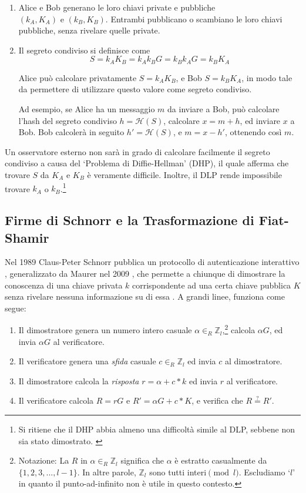 \begin{enumerate}
	\item Alice e Bob generano le loro chiavi private e pubbliche \((k_A, K_A) \textrm{ e } (k_B, K_B)\). Entrambi pubblicano o scambiano le loro chiavi pubbliche, senza rivelare quelle private.

	\item Il segreto condiviso si definisce come \[S = k_A K_B = k_A k_B G = k_B k_A G = k_B K_A\]

	Alice può calcolare privatamente \(S = k_A K_B\), e Bob \(S = k_B K_A\), in modo tale da permettere di utilizzare questo valore come segreto condiviso.

	Ad esempio, se Alice ha un messaggio $m$ da inviare a Bob, può calcolare l'hash del segreto condiviso \(h = \mathcal{H}(S)\), calcolare $x = m + h$, ed inviare $x$ a Bob. Bob calcolerà in seguito $h' = \mathcal{H}(S)$, e $m = x - h'$, ottenendo così $m$.
\end{enumerate}   

Un osservatore esterno non sarà in grado di calcolare facilmente il segreto condiviso a causa del `Problema di Diffie-Hellman' (DHP), il quale afferma che trovare $S$ da $K_A$ e $K_B$ è veramente difficile. Inoltre, il DLP rende impossibile trovare $k_A$ o $k_B$.\footnote{Si ritiene che il DHP abbia almeno una difficoltà simile al DLP, sebbene non sia stato dimostrato. \cite{diffie-hellman-problem}}


\subsection{Firme di Schnorr e la Trasformazione di Fiat-Shamir}
\label{sec:schnorr-fiat-shamir}

Nel 1989 Claus-Peter Schnorr pubblica un protocollo di autenticazione interattivo \cite{schnorr-signatures}, generalizzato da Maurer nel 2009 \cite{simple-zk-proof-maurer}, che permette a chiunque di dimostrare la conoscenza di una chiave privata $k$ corrispondente ad una certa chiave pubblica $K$ senza rivelare nessuna informazione su di essa \cite{Signatures2015BorromeanRS}. A grandi linee, funziona come segue:

\begin{enumerate}
	\item Il dimostratore genera un numero intero casuale \(\alpha \in_R \mathbb{Z}_l\),\footnote{\label{notation3_note}Notazione: La $R$ in \(\alpha \in_R \mathbb{Z}_l\) significa che $\alpha$ è estratto casualmente da \(\{1,2,3,...,l-1\}\). In altre parole, $\mathbb{Z}_l$ sono tutti interi$\pmod l$. Escludiamo `$l$' in quanto il punto-ad-infinito non è utile in questo contesto.} calcola $\alpha G$, ed invia $\alpha G$ al verificatore.
	\item Il verificatore genera una {\em sfida} casuale $c \in_R \mathbb{Z}_l$ ed invia $c$ al dimostratore.
	\item Il dimostratore calcola la {\em risposta} $r = \alpha + c*k$ ed invia $r$ al verificatore.
	\item Il verificatore calcola $R = r G$ e $R' = \alpha G + c*K$, e verifica che $R \stackrel{?}{=} R'$.
\end{enumerate}

